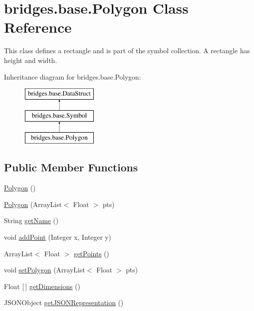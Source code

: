 \hypertarget{classbridges_1_1base_1_1_polygon}{}\section{bridges.\+base.\+Polygon Class Reference}
\label{classbridges_1_1base_1_1_polygon}


This class defines a rectangle and is part of the symbol collection. A rectangle has height and width.  


Inheritance diagram for bridges.\+base.\+Polygon\+:\begin{figure}[H]
\begin{center}
\leavevmode
\includegraphics[height=3.000000cm]{classbridges_1_1base_1_1_polygon}
\end{center}
\end{figure}
\subsection*{Public Member Functions}
\begin{DoxyCompactItemize}
\item 
\mbox{\hyperlink{classbridges_1_1base_1_1_polygon_af0c1b3bc3147ffbda98fd9c515a8052d}{Polygon}} ()
\item 
\mbox{\hyperlink{classbridges_1_1base_1_1_polygon_a341cc297ba7f0f201d31aa3c98ecf108}{Polygon}} (Array\+List$<$ Float $>$ pts)
\item 
String \mbox{\hyperlink{classbridges_1_1base_1_1_polygon_a2203367acb1a26dfa1a81d69ce61274f}{get\+Name}} ()
\item 
void \mbox{\hyperlink{classbridges_1_1base_1_1_polygon_a23af8508f5ef7c2bbe0784264ee86e16}{add\+Point}} (Integer x, Integer y)
\item 
Array\+List$<$ Float $>$ \mbox{\hyperlink{classbridges_1_1base_1_1_polygon_adf81f52211ad3c2c8318461e199b6df5}{get\+Points}} ()
\item 
void \mbox{\hyperlink{classbridges_1_1base_1_1_polygon_ac92747578a038f747de9b2ccc90dc972}{set\+Polygon}} (Array\+List$<$ Float $>$ pts)
\item 
Float \mbox{[}$\,$\mbox{]} \mbox{\hyperlink{classbridges_1_1base_1_1_polygon_ae6e7440de0d3de9084f924e08f515a67}{get\+Dimensions}} ()
\item 
J\+S\+O\+N\+Object \mbox{\hyperlink{classbridges_1_1base_1_1_polygon_a12489d762f32ce5259ae6640ad95f188}{get\+J\+S\+O\+N\+Representation}} ()
\end{DoxyCompactItemize}
